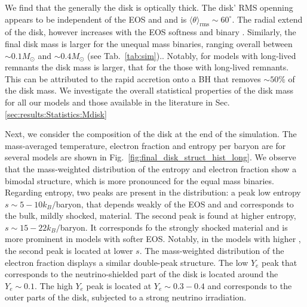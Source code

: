 We find that the generally the disk is optically thick.
The disk' RMS openning appears to be independent of the \ac{EOS} and \mr{} and
is $\langle\theta\rangle_{\text{rms}}\sim60^{\circ}$. 
The radial extend of the disk, however increases with the \ac{EOS} softness and 
binary \mr{}.
Similarly, the final disk mass is larger for the unequal mass binaries, 
ranging overall between ${\sim}0.1M_{\odot}$ and ${\sim}0.4M_{\odot}$
(see Tab.~\ref{tab:sim})..
Notably, for models with long-lived remnants the disk mass is larger,
that for the those with long-lived remnants. This can be attributed to the 
rapid accretion onto a \ac{BH} that removes $\sim50\%$ of the disk mass.
We investigate the overall statistical properties of the disk mass for all our models
and those available in the literature in Sec.\ref{sec:results:Statistics:Mdisk}

Next, we consider the composition of the disk at the end of the simulation.
The mass-averaged temperature, electron fraction and entropy per baryon
are for several models are shown in Fig.~\ref{fig:final_disk_struct_hist_long}.
We observe that the mass-weighted distribution of the entropy and electron 
fraction show a bimodal structure, which is more pronounced for the 
equal mass binaries. 
Regarding entropy, two peaks are present in the distribution:
a peak low entropy $s\sim5-10k_B/$baryon, that depends weakly of the 
\ac{EOS} and \mr{} and corresponds to the bulk, mildly shocked, material. 
The second peak is found at higher entropy, $s\sim15-22k_B/$baryon.
It corresponds fo the strongly shocked material and is more prominent 
in models with softer \ac{EOS}.
Notably, in the models with higher \mr{}, the second peak is located 
at lower $s$.
The mass-weighted distribution of the electron fraction 
displays a similar double-peak structure.
The low $Y_e$ peak that corresponds to the neutrino-shielded part of the 
disk is located around the $Y_e\sim0.1$.
The high $Y_e$ peak is located at $Y_e\sim0.3-0.4$ and corresponds to the outer parts of the disk, subjected to a strong neutrino irradiation.

